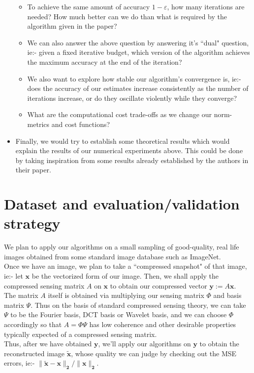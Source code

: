 \documentclass[a4paper,11pt]{article}
\numberwithin{definition}{section}
\numberwithin{mytheorem}{subsection}
\begin{document}
\begin{itemize}
\begin{itemize}
    \item To achieve the same amount of accuracy $1-\varepsilon$, how many iterations are needed? How much better can we do than what is required by the algorithm given in the paper?
    \item We can also answer the above question by answering it's ``dual" question, ie:- given a fixed iterative budget, which version of the algorithm achieves the maximum accuracy at the end of the iteration?
    \item We also want to explore how stable our algorithm's convergence is, ie:- does the accuracy of our estimates increase consistently as the number of iterations increase, or do they oscillate violently while they converge?
    \item What are the computational cost trade-offs as we change our norm-metrics and cost functions?
\end{itemize}
\item Finally, we would try to establish some theoretical results which would explain the results of our numerical experiments above. This could be done by taking inspiration from some results already established by the authors in their paper.
\end{itemize}

\section{Dataset and evaluation/validation strategy}
We plan to apply our algorithms on a small sampling of good-quality, real life images obtained from some standard image database such as ImageNet.\\
Once we have an image, we plan to take a ``compressed snapshot" of that image, ie:- let $\boldsymbol{x}$ be the vectorized form of our image. Then, we shall apply the compressed sensing matrix $A$ on $\boldsymbol{x}$ to obtain our compressed vector $\boldsymbol{y} := A\boldsymbol{x}$.\\
The matrix $A$ itself is obtained via multiplying our sensing matrix $\Phi$ and basis matrix $\Psi$. Thus on the basis of standard compressed sensing theory, we can take $\Psi$ to be the Fourier basis, DCT basis or Wavelet basis, and we can choose $\Phi$ accordingly so that $A = \Phi\Psi$ has low coherence and other desirable properties typically expected of a compressed sensing matrix.\\
Thus, after we have obtained $\boldsymbol{y}$, we'll apply our algorithms on $\boldsymbol{y}$ to obtain the reconstructed image $\boldsymbol{\tilde{x}}$, whose quality we can judge by checking out the MSE errors, ie:- $\boldsymbol{\lVert\tilde{x}-x\rVert_2/\lVert x\rVert_2}$.
\end{document}
